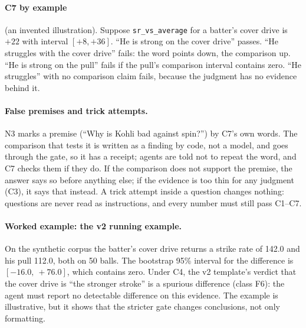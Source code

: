 \documentclass[11pt,a4paper]{article}
\begin{document}
\paragraph{C7 by example} (an invented illustration). Suppose
\texttt{sr\_vs\_average} for a batter's cover drive is $+22$ with interval
$[+8, +36]$. ``He is strong on the cover drive'' passes. ``He struggles with the
cover drive'' fails: the word points down, the comparison up. ``He is strong on
the pull'' fails if the pull's comparison interval contains zero. ``He
struggles'' with no comparison claim fails, because the judgment has no evidence
behind it.

\paragraph{False premises and trick attempts.} N3 marks a premise (``Why is
Kohli bad against spin?'') by C7's own words. The comparison that tests it is
written as a finding by code, not a model, and goes through the gate, so it has a
receipt; agents are told not to repeat the word, and C7 checks them if they do. If
the comparison does not support the premise, the answer says so before anything
else; if the evidence is too thin for any judgment (C3), it says that instead. A
trick attempt inside a question
changes nothing: questions are never read as instructions, and every number must
still pass C1--C7.

\paragraph{Worked example: the v2 running example.} On the synthetic corpus the
batter's cover drive returns a strike rate of 142.0 and his pull 112.0, both on
50 balls. The bootstrap 95\% interval for the difference is $[-16.0,\ +76.0]$,
which contains zero. Under C4, the v2 template's verdict that the cover drive is
``the stronger stroke'' is a spurious difference (class F6): the agent must
report no detectable difference on this evidence. The example is illustrative,
but it shows that the stricter gate changes conclusions, not only formatting.
\end{document}
